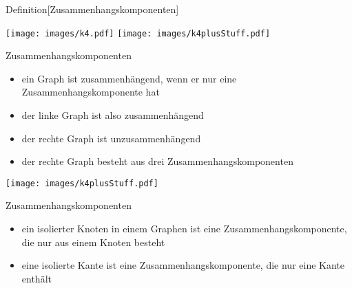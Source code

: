 \documentclass[aspectratio=1610, 11pt]{beamer}
\begin{document}
\begin{frame}
\begin{overprint}
\begin{block}{Definition\hfill[Zusammenhangskomponenten]}
\begin{itemize}
	\end{itemize}
	\end{block}
		\texttt{[image: images/k4.pdf]}\hfill
		\texttt{[image: images/k4plusStuff.pdf]}
\begin{exampleblock}{Zusammenhangskomponenten}
	\begin{itemize}
		\item ein Graph ist \alert{zusammenh\"angend}, wenn er nur eine Zusammenhangskomponente hat
		\item der linke Graph ist also zusammenh\"angend
		\item der rechte Graph ist unzusammenh\"angend
		\item der rechte Graph besteht aus drei Zusammenhangskomponenten
	\end{itemize}
	\end{exampleblock}
		\hfill\texttt{[image: images/k4plusStuff.pdf]}
\begin{exampleblock}{Zusammenhangskomponenten}
	\begin{itemize}
		\item ein \alert{isolierter Knoten} in einem Graphen ist eine Zusammenhangskomponente, die nur aus einem Knoten besteht
		\item eine \alert{isolierte Kante} ist eine Zusammenhangskomponente, die nur eine Kante enth\"alt
	\end{itemize}
	\end{exampleblock}
	\end{overprint}
\end{frame}
\end{document}
